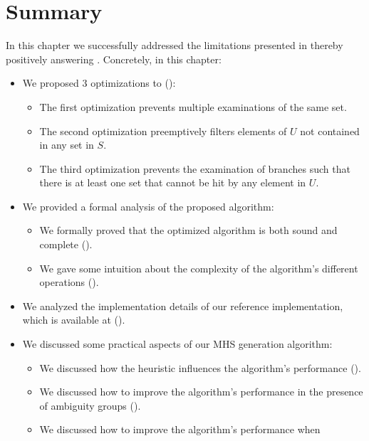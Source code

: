 \section{Summary}
\label{sec:mhs2o:summary}
In this chapter we successfully addressed the limitations presented in
thereby positively answering .
%
Concretely, in this chapter:
\begin{itemize}[nolistsep]
\item We proposed $3$ optimizations to \staccato{}
  ():
  \begin{itemize}
  \item The first optimization prevents multiple examinations of the
    same set.
  \item The second optimization preemptively filters elements of $U$
    not contained in any set in $S$.
  \item The third optimization prevents the examination of branches
    such that there is at least one set that cannot be hit by any
    element in $U$.
  \end{itemize}
\item We provided a formal analysis of the proposed algorithm:
  \begin{itemize}
  \item We formally proved that the optimized algorithm is both sound
    and complete ().
  \item We gave some intuition about the complexity of the algorithm's
    different operations
    ().
  \end{itemize}
\item We analyzed the implementation details of our reference
  implementation, which is available at \mhsIIURL{}
  ().
\item We discussed some practical aspects of our \ac{MHS} generation
  algorithm:
  \begin{itemize}
  \item We discussed how the heuristic influences the algorithm's
    performance ().
  \item We discussed how to improve the algorithm's performance in the
    presence of ambiguity groups
    ().
  \item We discussed how to improve the algorithm's performance when

\end{itemize}
\end{itemize}
